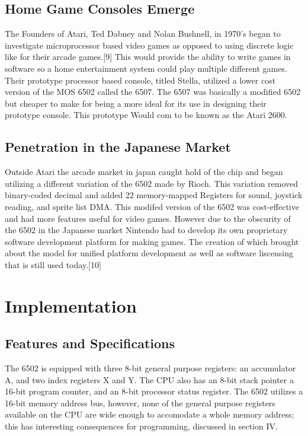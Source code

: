 \documentclass[journal]{IEEEtran}
\begin{document}
\subsection{Home Game Consoles Emerge}
The Founders of Atari, Ted Dabney and Nolan Bushnell, in 1970's began to investigate microprocessor based 
video games as opposed to using discrete logic like for their arcade games.[9]  This would provide the ability 
to write games in software so a home entertainment system could play multiple different games.  Their 
prototype processor based console, titled Stella, utilized a lower cost version of the MOS 6502 called the 
6507.  The 6507 was basically a modified 6502 but cheaper to make for being a more ideal for its use in designing 
their prototype console.  This prototype Would com to be known as the Atari 2600.  


\subsection{Penetration in the Japanese Market}
Outside Atari the arcade market in japan caught hold of the chip and began utilizing a different variation of 
the 6502 made by Rioch.  This variation removed binary-coded decimal and added 22 memory-mapped Registers for
sound, joystick reading, and sprite list DMA.  This modifed version of the 6502 was cost-effective and had more
features useful for video games.  However due to the obscurity of the 6502 in the Japanese market Nintendo had
to develop its own proprietary software development platform for making games.  The creation of which brought 
about the model for unified platform development as well as software liscensing that is still used today.[10]

\section{Implementation}

\subsection{Features and Specifications}

The 6502 is equipped with three 8-bit general purpose registers: an accumulator
A, and two index registers X and Y. The CPU also has
an 8-bit stack pointer a 16-bit program counter, and an 8-bit processor status
register. The 6502 utilizes a 16-bit memory address bus, however, none of the
general purpose registers available on the CPU are wide enough to accomodate a
whole memory address; this has interesting consequences for programming,
discussed in section IV.
\end{document}
